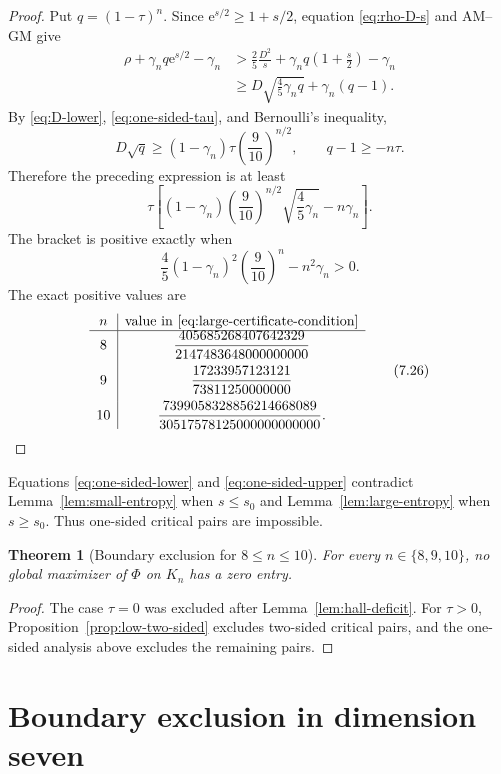 \documentclass[11pt]{article}
\newtheorem{theorem}{Theorem}[section]
\theoremstyle{definition}
\newcommand{\1}{\mathbf{1}}
\newcommand{\e}{\mathrm{e}}
\begin{document}
\begin{proof}
Put $q=(1-\tau)^n$.  Since $\e^{s/2}\ge1+s/2$, equation \eqref{eq:rho-D-s} and AM--GM give
\[
 \begin{aligned}
 \rho+\gamma_nq\e^{s/2}-\gamma_n
 &>\frac25\frac{D^2}{s}
   +\gamma_nq\left(1+\frac{s}{2}\right)-\gamma_n\\
 &\ge D\sqrt{\frac45\gamma_nq}+\gamma_n(q-1).
 \end{aligned}
\]
By \eqref{eq:D-lower}, \eqref{eq:one-sided-tau}, and Bernoulli's inequality,
\[
 D\sqrt q
 \ge(1-\gamma_n)\tau\left(\frac9{10}\right)^{n/2},
 \qquad
 q-1\ge-n\tau.
\]
Therefore the preceding expression is at least
\[
 \tau\left[
 (1-\gamma_n)\left(\frac9{10}\right)^{n/2}
 \sqrt{\frac45\gamma_n}
 -n\gamma_n
 \right].
\]
The bracket is positive exactly when
\[
 \frac45(1-\gamma_n)^2\left(\frac9{10}\right)^n
 -n^2\gamma_n>0.
 \tag{7.25}\label{eq:large-certificate-condition}
\]
The exact positive values are
\[
\begin{array}{c|c}
 n&\text{value in \eqref{eq:large-certificate-condition}}\\ \hline
 8&\dfrac{405685268407642329}{2147483648000000000}\\[3mm]
 9&\dfrac{17233957123121}{73811250000000}\\[3mm]
 10&\dfrac{7399058328856214668089}{30517578125000000000000}.
\end{array}
\tag{7.26}\label{eq:large-certificates}
\]
\end{proof}

Equations \eqref{eq:one-sided-lower} and \eqref{eq:one-sided-upper} contradict Lemma~\ref{lem:small-entropy} when $s\le s_0$ and Lemma~\ref{lem:large-entropy} when $s\ge s_0$.  Thus one-sided critical pairs are impossible.

\begin{theorem}[Boundary exclusion for $8\le n\le10$]\label{thm:boundary-low}
For every $n\in\{8,9,10\}$, no global maximizer of $\Phi$ on $K_n$ has a zero entry.
\end{theorem}

\begin{proof}
The case $\tau=0$ was excluded after Lemma~\ref{lem:hall-deficit}.  For $\tau>0$, Proposition~\ref{prop:low-two-sided} excludes two-sided critical pairs, and the one-sided analysis above excludes the remaining pairs.
\end{proof}

\section{Boundary exclusion in dimension seven}\label{sec:n7}
\end{document}
